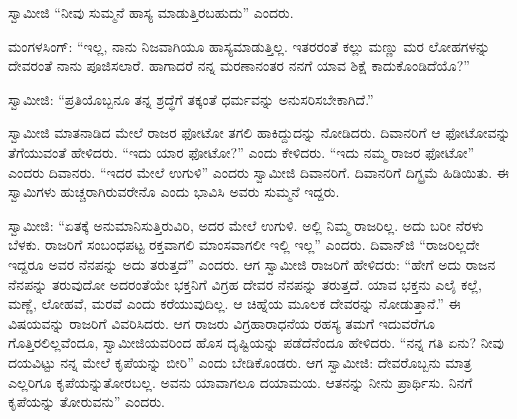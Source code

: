  ಸ್ವಾಮೀಜಿ “ನೀವು ಸುಮ್ಮನೆ ಹಾಸ್ಯ ಮಾಡುತ್ತಿರಬಹುದು” ಎಂದರು. 

 ಮಂಗಳಸಿಂಗ್: “ಇಲ್ಲ, ನಾನು ನಿಜವಾಗಿಯೂ ಹಾಸ್ಯಮಾಡುತ್ತಿಲ್ಲ. ಇತರರಂತೆ ಕಲ್ಲು ಮಣ್ಣು ಮರ ಲೋಹಗಳನ್ನು ದೇವರಂತೆ ನಾನು ಪೂಜಿಸಲಾರೆ. ಹಾಗಾದರೆ ನನ್ನ ಮರಣಾನಂತರ ನನಗೆ ಯಾವ ಶಿಕ್ಷೆ ಕಾದುಕೊಂಡಿದೆಯೊ?” 

 ಸ್ವಾಮೀಜಿ: “ಪ್ರತಿಯೊಬ್ಬನೂ ತನ್ನ ಶ್ರದ್ಧೆಗೆ ತಕ್ಕಂತೆ ಧರ್ಮವನ್ನು ಅನುಸರಿಸಬೇಕಾಗಿದೆ.” 

 ಸ್ವಾಮೀಜಿ ಮಾತನಾಡಿದ ಮೇಲೆ ರಾಜರ ಫೋಟೋ ತಗಲಿ ಹಾಕಿದ್ದುದನ್ನು ನೋಡಿದರು. ದಿವಾನರಿಗೆ ಆ ಫೋಟೋವನ್ನು ತೆಗೆಯುವಂತೆ ಹೇಳಿದರು. “ಇದು ಯಾರ ಫೋಟೋ?” ಎಂದು ಕೇಳಿದರು. “ಇದು ನಮ್ಮ ರಾಜರ ಫೋಟೋ” ಎಂದರು ದಿವಾನರು. “ಇದರ ಮೇಲೆ ಉಗುಳಿ” ಎಂದರು ಸ್ವಾಮೀಜಿ ದಿವಾನರಿಗೆ. ದಿವಾನರಿಗೆ ದಿಗ್ಭ್ರಮೆ ಹಿಡಿಯಿತು. ಈ ಸ್ವಾಮಿಗಳು ಹುಚ್ಚರಾಗಿರುವರೇನೊ ಎಂದು ಭಾವಿಸಿ ಅವರು ಸುಮ್ಮನೆ ಇದ್ದರು. 

 ಸ್ವಾಮೀಜಿ: “ಏತಕ್ಕೆ ಅನುಮಾನಿಸುತ್ತಿರುವಿರಿ, ಅದರ ಮೇಲೆ ಉಗುಳಿ. ಅಲ್ಲಿ ನಿಮ್ಮ ರಾಜರಿಲ್ಲ. ಅದು ಬರೀ ನೆರಳು ಬೆಳಕು. ರಾಜರಿಗೆ ಸಂಬಂಧಪಟ್ಟ ರಕ್ತವಾಗಲಿ ಮಾಂಸವಾಗಲೀ ಇಲ್ಲಿ ಇಲ್ಲ” ಎಂದರು. ದಿವಾನ್‍ಜಿ “ರಾಜರಿಲ್ಲದೇ ಇದ್ದರೂ ಅವರ ನೆನಪನ್ನು ಅದು ತರುತ್ತದೆ” ಎಂದರು. ಆಗ ಸ್ವಾಮೀಜಿ ರಾಜರಿಗೆ ಹೇಳಿದರು: “ಹೇಗೆ ಅದು ರಾಜನ ನೆನಪನ್ನು ತರುವುದೋ ಅದರಂತೆಯೇ ಭಕ್ತನಿಗೆ ವಿಗ್ರಹ ದೇವರ ನೆನಪನ್ನು ತರುತ್ತದೆ. ಯಾವ ಭಕ್ತನು ಎಲೈ ಕಲ್ಲೆ, ಮಣ್ಣೆ, ಲೋಹವೆ, ಮರವೆ ಎಂದು ಕರೆಯುವುದಿಲ್ಲ. ಆ ಚಿಹ್ನೆಯ ಮೂಲಕ ದೇವರನ್ನು ನೋಡುತ್ತಾನೆ.” ಈ ವಿಷಯವನ್ನು ರಾಜರಿಗೆ ವಿವರಿಸಿದರು. ಆಗ ರಾಜರು ವಿಗ್ರಹಾರಾಧನೆಯ ರಹಸ್ಯ ತಮಗೆ ಇದುವರೆಗೂ ಗೊತ್ತಿರಲಿಲ್ಲವೆಂದೂ, ಸ್ವಾಮೀಜಿಯವರಿಂದ ಹೊಸ ದೃಷ್ಟಿಯನ್ನು ಪಡೆದೆನೆಂದೂ ಹೇಳಿದರು. “ನನ್ನ ಗತಿ ಏನು? ನೀವು ದಯವಿಟ್ಟು ನನ್ನ ಮೇಲೆ ಕೃಪೆಯನ್ನು ಬೀರಿ” ಎಂದು ಬೇಡಿಕೊಂಡರು. ಆಗ ಸ್ವಾಮೀಜಿ: ದೇವರೊಬ್ಬನು ಮಾತ್ರ ಎಲ್ಲರಿಗೂ ಕೃಪೆಯನ್ನು\break ತೋರಬಲ್ಲ. ಅವನು ಯಾವಾಗಲೂ ದಯಾಮಯ. ಆತನನ್ನು ನೀನು ಪ್ರಾರ್ಥಿಸು. ನಿನಗೆ ಕೃಪೆಯನ್ನು ತೋರುವನು” ಎಂದರು. 

